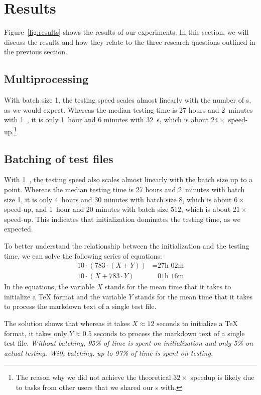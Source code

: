 \documentclass[final]{ltugboat}
\begin{document}
\section{Results}
\label{sec:results}

Figure~\ref{fig:results} shows the results of our experiments. In this section, we will discuss the results and how they relate to the three research questions outlined in the previous section.

\subsection{Multiprocessing}
With batch size 1, the testing speed scales almost linearly with the number of s, as we would expect. Whereas the median testing time is 27 hours and 2~minutes with 1~, it is only 1~hour and 6 minutes with 32~s, which is about $24\times$ speed-up.\footnote{The reason why we did not achieve the theoretical $32\times$ speedup is likely due to tasks from other users that we shared our s with.}

\subsection{Batching of test files}
With 1~, the testing speed also scales almost linearly with the batch size up to a point. Whereas the median testing time is 27 hours and 2~minutes with batch size 1, it is only 4~hours and 30 minutes with batch size 8, which is about $6\times$ speed-up, and 1~hour and 20 minutes with batch size 512, which is about $21\times$ speed-up. This indicates that initialization dominates the testing time, as we expected.

To better understand the relationship between the initialization and the testing time, we can solve the following series of equations:
\begin{align*}
    10\cdot(783\cdot(X + Y)) &= \text{27h 02m} \tag{Batch size 1} \\
    10\cdot(X + 783\cdot Y) &= \text{01h 16m}  \tag{Batch size 1024}
\end{align*}
In the equations, the variable $X$ stands for the mean time that it takes to initialize a \TeX{} format and the variable $Y$ stands for the mean time that it takes to process the markdown text of a single test file.

The solution shows that whereas it takes $X\approx\text{12 seconds}$ to initialize a \TeX{} format, it takes only $Y\approx\text{0.5 seconds}$ to process the markdown text of a single test file. \emph{Without batching, 95\% of time is spent on initialization and only 5\% on actual testing. With batching, up to 97\% of time is spent on testing.}
\end{document}
